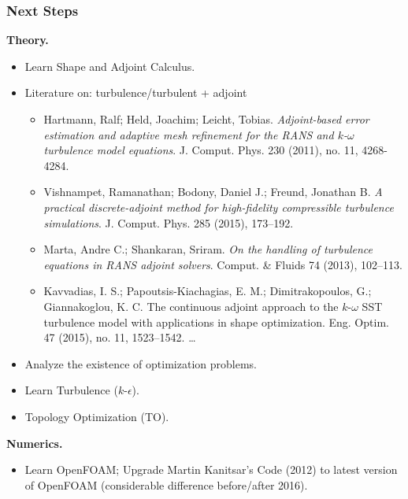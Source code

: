 \documentclass[t,xcolor=table,english]{beamer}   %
\begin{document}
\begin{frame}
	\frametitle{Next Steps}
	\textbf{Theory.}
	\begin{itemize}
		\item Learn Shape and Adjoint Calculus.
		\item Literature on: {\color{blue} turbulence/turbulent + adjoint}
		\begin{itemize}
			\item Hartmann, Ralf; Held, Joachim; Leicht, Tobias. \textit{Adjoint-based error estimation and adaptive mesh refinement for the RANS and $k$-$\omega$ turbulence model equations}. J. Comput. Phys. 230 (2011), no. 11, 4268-4284.
			\item Vishnampet, Ramanathan; Bodony, Daniel J.; Freund, Jonathan B. \textit{A practical discrete-adjoint method for high-fidelity compressible turbulence simulations}. J. Comput. Phys. 285 (2015), 173–192.
			\item Marta, Andre C.; Shankaran, Sriram. \textit{On the handling of turbulence equations in RANS adjoint solvers}. Comput. \& Fluids 74 (2013), 102–113.
			\item Kavvadias, I. S.; Papoutsis-Kiachagias, E. M.; Dimitrakopoulos, G.; Giannakoglou, K. C. The continuous adjoint approach to the $k$-$\omega$ SST turbulence model with applications in shape optimization. Eng. Optim. 47 (2015), no. 11, 1523–1542. \ldots
		\end{itemize}		
		\item Analyze the existence of optimization problems.
		\item Learn Turbulence ($k$-$\epsilon$).
		\item Topology Optimization (TO).
	\end{itemize}
	\textbf{Numerics.}
	\begin{itemize}
		\item Learn OpenFOAM; Upgrade Martin Kanitsar's Code (2012) to latest version of OpenFOAM (considerable difference before/after 2016). 
	\end{itemize}
\end{frame}
\end{document}
